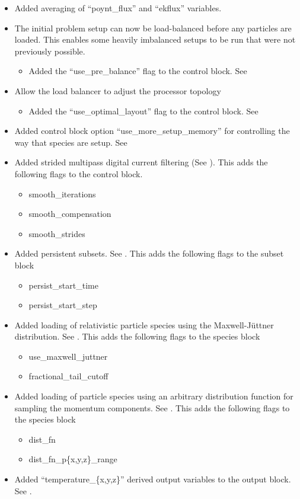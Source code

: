 \begin{itemize}
\item Added averaging of ``poynt\_flux'' and ``ekflux'' variables.
\item The initial problem setup can now be load-balanced before any particles
    are loaded. This enables some heavily imbalanced setups to be run that were
    not previously possible.
\begin{itemize}
\item Added the ``use\_pre\_balance'' flag to the control block.
    See 
\end{itemize}
\item Allow the load balancer to adjust the processor topology
\begin{itemize}
\item Added the ``use\_optimal\_layout'' flag to the control block.
    See 
\end{itemize}
\item Added control block option ``use\_more\_setup\_memory'' for controlling
    the way that species are setup. See 
\item Added strided multipass digital current filtering
    (See ). This adds the following flags to the
    control block.
\begin{itemize}
\item smooth\_iterations
\item smooth\_compensation
\item smooth\_strides
\end{itemize}
\item Added persistent subsets. See . This adds the
    following flags to the subset block
\begin{itemize}
\item persist\_start\_time
\item persist\_start\_step
\end{itemize}
\item Added loading of relativistic particle species using the
    Maxwell-J\"uttner distribution. See . This adds the
    following flags to the species block
\begin{itemize}
\item use\_maxwell\_juttner
\item fractional\_tail\_cutoff
\end{itemize}
\item Added loading of particle species using an arbitrary distribution
    function for sampling the momentum components. See
    . This adds the following flags to the species block
\begin{itemize}
\item dist\_fn
\item dist\_fn\_p\{x,y,z\}\_range
\end{itemize}
\item Added ``temperature\_\{x,y,z\}'' derived output variables to the
    output block. See .
\end{itemize}
\bigskip


